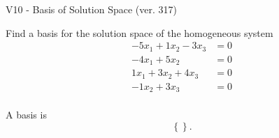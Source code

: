 \begin{exercise}
  \begin{exerciseTitle}V10 - Basis of Solution Space (ver. 317)\end{exerciseTitle}
  \begin{exerciseStatement}
    Find a basis for the solution space of the homogeneous system 
\begin{align*}
 -5 x_ 1 + 1 x_ 2 -3 x_ 3 &= 0  \\ 
  -4 x_ 1 + 5 x_ 2 &= 0  \\ 
  1 x_ 1 + 3 x_ 2 + 4 x_ 3 &= 0  \\ 
  -1 x_ 2 + 3 x_ 3 &= 0  \\ 
 \end{align*}


 
  \end{exerciseStatement}

  \begin{exerciseAnswer}
   A basis is   
\[\left\{\right\}.\]

  


  \end{exerciseAnswer}
\end{exercise}
